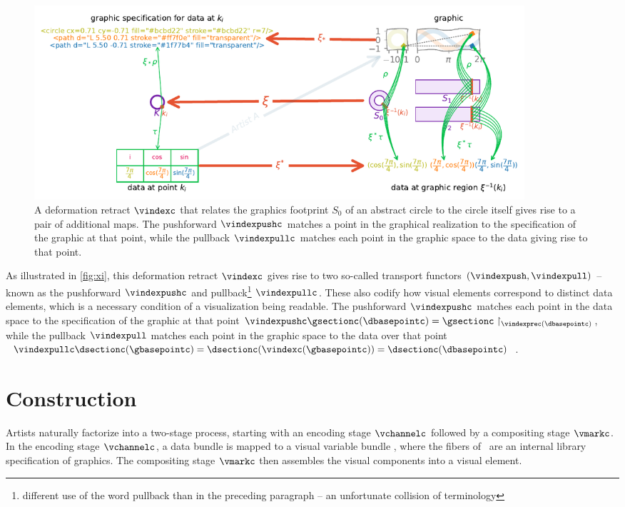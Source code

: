 \documentclass[preprint]{vgtc}
\begin{document}
\begin{figure}[h]
    \includegraphics[width=7.16in]{xi_diagram.pdf}
    \caption{A deformation retract $\vindexc$ that relates the graphics footprint $S_0$ of an abstract circle to the circle itself gives rise to a pair of additional maps. The pushforward $\vindexpushc$ matches a point in the graphical realization to the specification of the graphic at that point, while the pullback $\vindexpullc$ matches each point in the graphic space to the data giving rise to that point.
    }
    \label{fig:xi}
\end{figure}

As illustrated in \autoref{fig:xi}, this deformation retract $\vindexc$ gives rise to two so-called transport functors $(\vindexpush, \vindexpull)$ -- known as the pushforward $\vindexpushc$ and pullback\footnote{different use of the word pullback than in the preceding paragraph -- an unfortunate collision of terminology} $\vindexpullc$. These also codify how visual elements correspond to distinct data elements, which is a necessary condition of a visualization being readable\cite{ziemkiewiczEmbeddingInformationVisualization2009}. The pushforward $\vindexpushc$ matches each point in the data space to the specification of the graphic at that point $\vindexpushc\gsectionc(\dbasepointc) = \gsectionc\restriction_{\vindexprec(\dbasepointc)}$, while the pullback $\vindexpull$ matches each point in the graphic space to the data over that point $\vindexpullc\dsectionc(\gbasepointc) = \dsectionc(\vindexc(\gbasepointc)) = \dsectionc(\dbasepointc)$.




\section{Construction}

Artists naturally factorize into a two-stage process, starting with an encoding stage $\vchannelc$ followed by a compositing stage $\vmarkc$. In the \textcolor{artist}{encoding} stage $\vchannelc$, a data bundle is mapped to a visual variable bundle \vchannel, where the fibers of \vchannel\ are an internal library specification of graphics. The \textcolor{artist}{compositing} stage $\vmarkc$ then assembles the visual components into a visual element.
\end{document}
